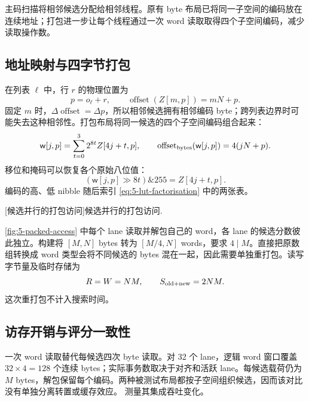 主码扫描将相邻候选分配给相邻线程。原有 byte 布局已将同一子空间的编码放在连续地址；打包进一步让每个线程通过一次 word 读取取得四个子空间编码，减少读取操作数。

\subsection{地址映射与四字节打包}

在列表 $\ell$ 中，行 $r$ 的物理位置为
\[
 p=o_\ell+r,\qquad \operatorname{offset}(Z[m,p])=mN+p.
\]
固定 $m$ 时，$\Delta\operatorname{offset}=\Delta p$，所以相邻候选拥有相邻编码 byte；跨列表边界时可能失去这种相邻性。打包布局将同一候选的四个子空间编码组合起来：
\begin{equation}
 \mathsf{w}[j,p]=\sum_{t=0}^{3}2^{8t}Z[4j+t,p],\qquad
 \operatorname{offset}_{\rm bytes}(\mathsf{w}[j,p])=4(jN+p).
 \label{eq:5-packed-layout}
\end{equation}
移位和掩码可以恢复各个原始八位值：
\[
 (\mathsf w[j,p]\gg8t)\mathbin{\&}255=Z[4j+t,p].
\]
编码的高、低 nibble 随后索引 \cref{eq:5-lut-factorisation} 中的两张表。

\par\medskip\noindent\begin{minipage}{\linewidth}
\captionsetup{hypcap=false}
\centering

[候选并行的打包访问]{候选并行的打包访问.}
\label{fig:5-packed-access}
\end{minipage}\par\medskip
\cref{fig:5-packed-access} 中每个 lane 读取并解包自己的 word，各 lane 的候选分数彼此独立。构建将 $[M,N]$ bytes 转为 $[M/4,N]$ words，要求 $4\mid M$。直接把原数组转换成 word 类型会将不同候选的 bytes 混在一起，因此需要单独重打包。读写字节量及临时存储为
\[
 R=W=NM,\qquad S_{\rm old+new}=2NM.
\]
这次重打包不计入搜索时间。

\subsection{访存开销与评分一致性}

一次 word 读取替代每候选四次 byte 读取。对 32 个 lane，逻辑 word 窗口覆盖 $32\times4=128$ 个连续 bytes；实际事务数取决于对齐和活跃 lane。每候选载荷仍为 $M$ bytes，解包保留每个编码。两种被测试布局都按子空间组织候选，因而该对比没有单独分离转置或缓存效应。 测量其集成吞吐变化。
